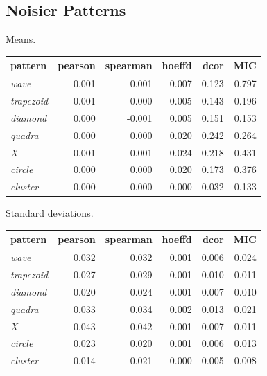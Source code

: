 \documentclass[english,nohyper,titlepage]{tufte-handout}\usepackage{graphicx, color}
\begin{document}
\subsection{Noisier Patterns}
{\footnotesize
Means.\\
\begin{tabular}{lrrrrr}
pattern & pearson & spearman & hoeffd & dcor & MIC \\
\hline
\emph{wave} &  0.001 & 0.001 & 0.007 & 0.123 & 0.797 \\
\emph{trapezoid} & -0.001 & 0.000 & 0.005 & 0.143 & 0.196 \\
\emph{diamond} &  0.000 & -0.001 & 0.005 & 0.151 & 0.153 \\
\emph{quadra} & 0.000 & 0.000 & 0.020 & 0.242 & 0.264 \\
\emph{X}   & 0.001 & 0.001 & 0.024 & 0.218 & 0.431 \\
\emph{circle} & 0.000 & 0.000 & 0.020 & 0.173 & 0.376 \\
\emph{cluster} & 0.000 & 0.000 & 0.000 & 0.032 & 0.133 \\
\hline
\end{tabular}

\vspace{.25cm}
\noindent Standard deviations.\\
\begin{tabular}{lrrrrr}
pattern & pearson & spearman & hoeffd & dcor & MIC \\
\hline
\emph{wave} & 0.032 & 0.032 & 0.001 & 0.006 & 0.024 \\
\emph{trapezoid} & 0.027 & 0.029 & 0.001 & 0.010 & 0.011 \\
\emph{diamond} & 0.020 & 0.024 & 0.001 & 0.007 & 0.010 \\
\emph{quadra} & 0.033 & 0.034 & 0.002 & 0.013 & 0.021 \\
\emph{X} & 0.043 & 0.042 & 0.001 & 0.007 & 0.011 \\
\emph{circle} & 0.023 & 0.020 & 0.001 & 0.006 & 0.013 \\
\emph{cluster} & 0.014 & 0.021 & 0.000 & 0.005 & 0.008 \\
\hline
\end{tabular}


}
\end{document}
